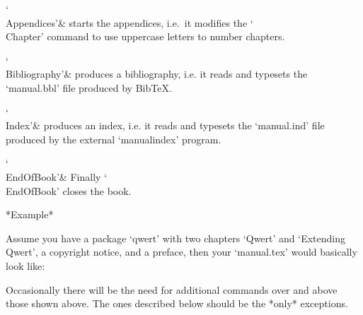 \indextt{\\Appendices}
`\\Appendices'&
starts the appendices, i.e.~it modifies the `\\Chapter'  command  to  use
uppercase letters to number chapters.

\indextt{\\Bibliography}
`\\Bibliography'&
produces a bibliography, i.e. it reads and typesets the `manual.bbl' file
produced by Bib{\TeX}.

\indextt{\\Index}
`\\Index'&
produces an index, i.e. it  reads  and  typesets  the  `manual.ind'  file
produced by the external `manualindex' program.

\indextt{\\EndOfBook}
`\\EndOfBook'&
Finally `\\EndOfBook' closes the book.

\enditems

*Example*

Assume you have a {\GAP} package `qwert' with two  chapters  `Qwert'  and
`Extending Qwert', a copyright notice, and a preface, then your
`manual.tex' would basically look like:

\begintt
  \TableOfContents
  \FrontMatter
  \Chapters
  \Appendices
    \Index
\EndOfBook
\endtt

\indextt{\\PseudoInput}\indextt{\\Day}\indextt{\\Month}\indextt{\\Year}
\indextt{\\Today}
Occasionally there will be the need  for  additional  commands  over  and
above those shown above. The ones described below should  be  the  *only*
exceptions.
\beginlist%

